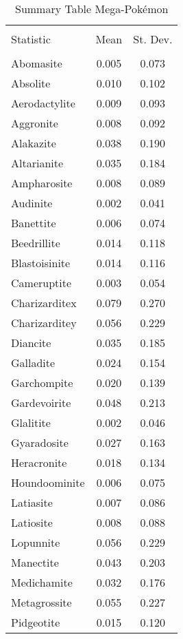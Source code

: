 \documentclass[12pt,twoside]{reedthesis}
\begin{document}
  \begin{table}[!htbp] \centering 
    \caption{Summary Table Mega-Pokémon} 
    \label{} 
  \begin{tabular}{@{\extracolsep{5pt}}lcc} 
  \\[-1.8ex]\hline 
  \hline \\[-1.8ex] 
  Statistic & \multicolumn{1}{c}{Mean} & \multicolumn{1}{c}{St. Dev.} \\ 
  \hline \\[-1.8ex] 
  Abomasite & 0.005 & 0.073 \\ 
  Absolite & 0.010 & 0.102 \\ 
  Aerodactylite & 0.009 & 0.093 \\ 
  Aggronite & 0.008 & 0.092 \\ 
  Alakazite & 0.038 & 0.190 \\ 
  Altarianite & 0.035 & 0.184 \\ 
  Ampharosite & 0.008 & 0.089 \\ 
  Audinite & 0.002 & 0.041 \\ 
  Banettite & 0.006 & 0.074 \\ 
  Beedrillite & 0.014 & 0.118 \\ 
  Blastoisinite & 0.014 & 0.116 \\ 
  Cameruptite & 0.003 & 0.054 \\ 
  Charizarditex & 0.079 & 0.270 \\ 
  Charizarditey & 0.056 & 0.229 \\ 
  Diancite & 0.035 & 0.185 \\ 
  Galladite & 0.024 & 0.154 \\ 
  Garchompite & 0.020 & 0.139 \\ 
  Gardevoirite & 0.048 & 0.213 \\ 
  Glalitite & 0.002 & 0.046 \\ 
  Gyaradosite & 0.027 & 0.163 \\ 
  Heracronite & 0.018 & 0.134 \\ 
  Houndoominite & 0.006 & 0.075 \\ 
  Latiasite & 0.007 & 0.086 \\ 
  Latiosite & 0.008 & 0.088 \\ 
  Lopunnite & 0.056 & 0.229 \\ 
  Manectite & 0.043 & 0.203 \\ 
  Medichamite & 0.032 & 0.176 \\ 
  Metagrossite & 0.055 & 0.227 \\ 
  Pidgeotite & 0.015 & 0.120 \\ 

\end{tabular}
\end{table}
\end{document}
